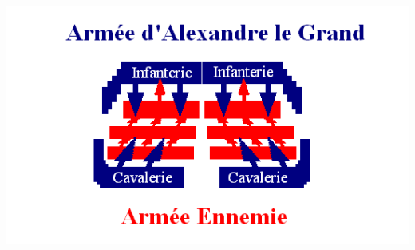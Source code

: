 \documentclass{article}
\begin{document}
\includegraphics[width=\linewidth]{../ressources/enclume2}
\cite{Alexanders_tactics}
\end{document}
